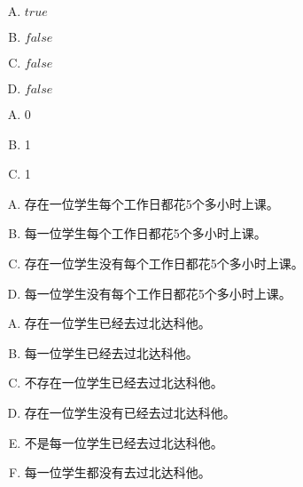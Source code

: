 {{        %
        \begin{practices}
            \begin{enumerate}[A.]
                \item $true$
                \item $false$
                \item $false$
                \item $false$
            \end{enumerate}
        \end{practices}

        \begin{practices}
            \begin{enumerate}[A.]
                \item 0
                \item 1
                \item 1
            \end{enumerate}
        \end{practices}

        \begin{practices}
            \begin{enumerate}[A.]
                \item 存在一位学生每个工作日都花5个多小时上课。
                \item 每一位学生每个工作日都花5个多小时上课。
                \item 存在一位学生没有每个工作日都花5个多小时上课。
                \item 每一位学生没有每个工作日都花5个多小时上课。
            \end{enumerate}
        \end{practices}

        \begin{practices}
            \begin{enumerate}[A.]
                \item 存在一位学生已经去过北达科他。
                \item 每一位学生已经去过北达科他。
                \item 不存在一位学生已经去过北达科他。
                \item 存在一位学生没有已经去过北达科他。
                \item 不是每一位学生已经去过北达科他。
                \item 每一位学生都没有去过北达科他。
            \end{enumerate}
        \end{practices}

}}
